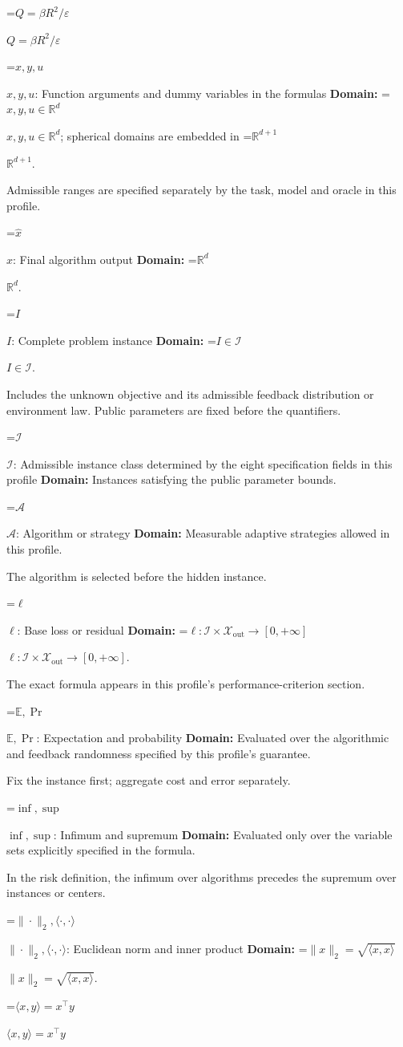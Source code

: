 \documentclass[10pt,a4paper]{article}
\newcommand{\AtlasMath}[1]{\par\begingroup\centering\setbox0=\hbox{$\displaystyle #1$}\ifdim\wd0>1.4\linewidth\typeout{ATLAS WIDE FORMULA: \the\wd0}\fi\ifdim\wd0>\linewidth\resizebox{\linewidth}{!}{\box0}\else\box0\fi\par\endgroup}
\newcommand{\AtlasInlineMath}[1]{\begingroup\setbox0=\hbox{$#1$}\ifdim\wd0>.4\linewidth\endgroup\AtlasMath{#1}\else\endgroup$#1$\fi}
\begin{document}
\AtlasInlineMath{Q=\beta R^2/\varepsilon}

\AtlasInlineMath{x,y,u}: Function arguments and dummy variables in the formulas \textbf{Domain:} \AtlasInlineMath{x,y,u\in\mathbb{R}^d}; spherical domains are embedded in \AtlasInlineMath{\mathbb{R}^{d+1}}.

Admissible ranges are specified separately by the task, model and oracle in this profile.

\AtlasInlineMath{\widehat{x}}: Final algorithm output \textbf{Domain:} \AtlasInlineMath{\mathbb{R}^d}.

\AtlasInlineMath{I}: Complete problem instance \textbf{Domain:} \AtlasInlineMath{I\in\mathcal{I}}.

Includes the unknown objective and its admissible feedback distribution or environment law. Public parameters are fixed before the quantifiers.

\AtlasInlineMath{\mathcal{I}}: Admissible instance class determined by the eight specification fields in this profile \textbf{Domain:} Instances satisfying the public parameter bounds.

\AtlasInlineMath{\mathcal{A}}: Algorithm or strategy \textbf{Domain:} Measurable adaptive strategies allowed in this profile.

The algorithm is selected before the hidden instance.

\AtlasInlineMath{\ell}: Base loss or residual \textbf{Domain:} \AtlasInlineMath{\ell:\mathcal{I}\times\mathcal{X}_{\mathrm{out}}\to[0,+\infty]}.

The exact formula appears in this profile's performance-criterion section.

\AtlasInlineMath{\mathbb{E},\Pr}: Expectation and probability \textbf{Domain:} Evaluated over the algorithmic and feedback randomness specified by this profile's guarantee.

Fix the instance first; aggregate cost and error separately.

\AtlasInlineMath{\inf,\sup}: Infimum and supremum \textbf{Domain:} Evaluated only over the variable sets explicitly specified in the formula.

In the risk definition, the infimum over algorithms precedes the supremum over instances or centers.

\AtlasInlineMath{\|\cdot\|_2,\langle\cdot,\cdot\rangle}: Euclidean norm and inner product \textbf{Domain:} \AtlasInlineMath{\|x\|_2=\sqrt{\langle x,x\rangle}}.

\AtlasInlineMath{\langle x,y\rangle=x^\top y}
\end{document}
